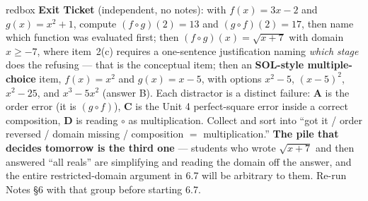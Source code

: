 \documentclass[10pt]{article}
\begin{document}
\begin{skillbox}{redbox}
\textbf{Exit Ticket} (independent, no notes): with $f(x)=3x-2$ and $g(x)=x^{2}+1$, compute
$(f\circ g)(2)=13$ and $(g\circ f)(2)=17$, then name which function was evaluated first; then
$(f\circ g)(x)=\sqrt{x+7}$ with domain $x\ge-7$, where item~2(c) requires a one-sentence
justification naming \emph{which stage} does the refusing --- that is the conceptual item; then an
\textbf{SOL-style multiple-choice} item, $f(x)=x^{2}$ and $g(x)=x-5$, with options $x^{2}-5$,
$(x-5)^{2}$, $x^{2}-25$, and $x^{3}-5x^{2}$ (answer B). Each distractor is a distinct failure:
\textbf{A} is the order error (it is $(g\circ f)$), \textbf{C} is the Unit 4 perfect-square error
inside a correct composition, \textbf{D} is reading $\circ$ as multiplication. Collect and sort into
``got it / order reversed / domain missing / composition $=$ multiplication.'' \textbf{The pile that
decides tomorrow is the third one} --- students who wrote $\sqrt{x+7}$ and then answered ``all
reals'' are simplifying and reading the domain off the answer, and the entire restricted-domain
argument in 6.7 will be arbitrary to them. Re-run Notes \S6 with that group before starting 6.7.
\end{skillbox}
\end{document}

